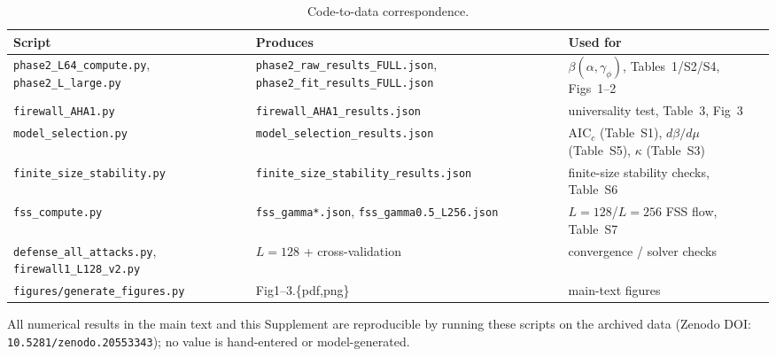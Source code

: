 \documentclass[aps,prb,twocolumn,superscriptaddress]{revtex4-2}
\begin{document}
\begin{table}[h]
\caption{Code-to-data correspondence.}
\label{tab:S8}
\begin{ruledtabular}
\begin{tabular}{lll}
Script & Produces & Used for \\
\hline
\texttt{phase2\_L64\_compute.py}, \texttt{phase2\_L\_large.py} & \texttt{phase2\_raw\_results\_FULL.json}, \texttt{phase2\_fit\_results\_FULL.json} & $\beta(\alpha,\gamma_\phi)$, Tables~1/S2/S4, Figs~1--2 \\
\texttt{firewall\_AHA1.py} & \texttt{firewall\_AHA1\_results.json} & universality test, Table~3, Fig~3 \\
\texttt{model\_selection.py} & \texttt{model\_selection\_results.json} & $\text{AIC}_c$ (Table~S1), $d\beta/d\mu$ (Table~S5), $\kappa$ (Table~S3) \\
\texttt{finite\_size\_stability.py} & \texttt{finite\_size\_stability\_results.json} & finite-size stability checks, Table~S6 \\
\texttt{fss\_compute.py} & \texttt{fss\_gamma*.json}, \texttt{fss\_gamma0.5\_L256.json} & $L{=}128$/$L{=}256$ FSS flow, Table~S7 \\
\texttt{defense\_all\_attacks.py}, \texttt{firewall1\_L128\_v2.py} & $L{=}128$ + cross-validation & convergence / solver checks \\
\texttt{figures/generate\_figures.py} & Fig1--3.\{pdf,png\} & main-text figures \\
\end{tabular}
\end{ruledtabular}
\end{table}

All numerical results in the main text and this Supplement are reproducible by running these scripts on the archived data (Zenodo DOI: \texttt{10.5281/zenodo.20553343}); no value is hand-entered or model-generated.
\end{document}
